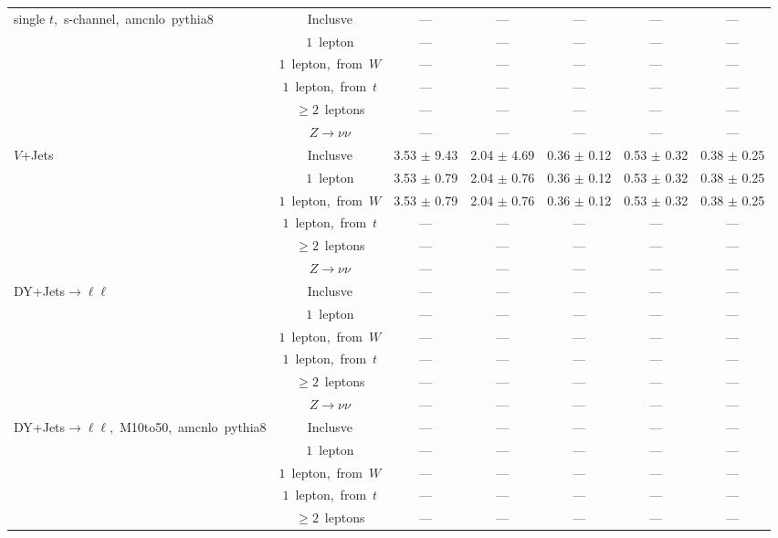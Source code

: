 \documentclass{article}
\begin{document}
\begin{longtable}{|l|c|c|c|c|c|c|}
\hline 
\multirow{6}{*}{single $t$,~s-channel,~amcnlo~pythia8} & Inclusve  & ---  & ---  & ---  & ---  & --- \\* 
 & $1$~lepton  & ---  & ---  & ---  & ---  & --- \\* 
 & $1$~lepton,~from~$W$  & ---  & ---  & ---  & ---  & --- \\* 
 & $1$~lepton,~from~$t$  & ---  & ---  & ---  & ---  & --- \\* 
 & $\ge2$~leptons  & ---  & ---  & ---  & ---  & --- \\* 
 & $Z\rightarrow\nu\nu$  & ---  & ---  & ---  & ---  & --- \\* 
\hline 
\multirow{6}{*}{$V$+Jets} & Inclusve  & 3.53 $\pm$ 9.43  & 2.04 $\pm$ 4.69  & 0.36 $\pm$ 0.12  & 0.53 $\pm$ 0.32  & 0.38 $\pm$ 0.25 \\* 
 & $1$~lepton  & 3.53 $\pm$ 0.79  & 2.04 $\pm$ 0.76  & 0.36 $\pm$ 0.12  & 0.53 $\pm$ 0.32  & 0.38 $\pm$ 0.25 \\* 
 & $1$~lepton,~from~$W$  & 3.53 $\pm$ 0.79  & 2.04 $\pm$ 0.76  & 0.36 $\pm$ 0.12  & 0.53 $\pm$ 0.32  & 0.38 $\pm$ 0.25 \\* 
 & $1$~lepton,~from~$t$  & ---  & ---  & ---  & ---  & --- \\* 
 & $\ge2$~leptons  & ---  & ---  & ---  & ---  & --- \\* 
 & $Z\rightarrow\nu\nu$  & ---  & ---  & ---  & ---  & --- \\* 
\hline 
\multirow{6}{*}{DY+Jets$\rightarrow\ell\ell$} & Inclusve  & ---  & ---  & ---  & ---  & --- \\* 
 & $1$~lepton  & ---  & ---  & ---  & ---  & --- \\* 
 & $1$~lepton,~from~$W$  & ---  & ---  & ---  & ---  & --- \\* 
 & $1$~lepton,~from~$t$  & ---  & ---  & ---  & ---  & --- \\* 
 & $\ge2$~leptons  & ---  & ---  & ---  & ---  & --- \\* 
 & $Z\rightarrow\nu\nu$  & ---  & ---  & ---  & ---  & --- \\* 
\hline 
\multirow{6}{*}{DY+Jets$\rightarrow\ell\ell$,~M10to50,~amcnlo~pythia8} & Inclusve  & ---  & ---  & ---  & ---  & --- \\* 
 & $1$~lepton  & ---  & ---  & ---  & ---  & --- \\* 
 & $1$~lepton,~from~$W$  & ---  & ---  & ---  & ---  & --- \\* 
 & $1$~lepton,~from~$t$  & ---  & ---  & ---  & ---  & --- \\* 
 & $\ge2$~leptons  & ---  & ---  & ---  & ---  & --- \\* 

\end{longtable}
\end{document}
